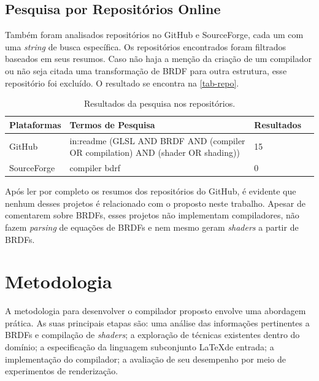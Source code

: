 \documentclass[english, 
               brazil, 
               bsc] %
               {dcomp-abntex2}
\begin{document}
\section{Pesquisa por Repositórios Online}
Também foram analisados repositórios no GitHub e SourceForge, cada um com uma \textit{string} de busca específica. Os repositórios encontrados foram filtrados baseados em seus resumos. Caso não haja a menção da criação de um compilador ou não seja citada uma transformação de BRDF para outra estrutura, esse repositório foi excluído. O resultado se encontra na \autoref{tab-repo}.






\begin{table}[H]
\ABNTEXfontereduzida
\caption[bases]{\small Resultados da pesquisa nos repositórios.}
\label{tab-repo}
\begin{tabular}{p{2.6cm}|p{6.0cm}|p{2.25cm}|p{3.40cm}}
   \textbf{Plataformas} & \textbf{Termos de Pesquisa}  & \textbf{Resultados}\\
   \hline
   GitHub
   &
   in:readme (GLSL AND BRDF AND  (compiler OR compilation) AND (shader OR shading))
   & 15
   \\ \hline
   SourceForge
   &
   compiler bdrf
   & 0
\end{tabular}
\end{table}




Após ler por completo os resumos dos repositórios do GitHub, é evidente que nenhum desses projetos é relacionado com o proposto neste trabalho. Apesar de comentarem sobre BRDFs, esses projetos não implementam compiladores, não fazem \textit{parsing} de equações de BRDFs e nem mesmo geram \textit{shaders} a partir de BRDFs.


\chapter{Metodologia} \label{metodologia}


A metodologia para desenvolver o compilador proposto envolve uma abordagem prática. As suas principais etapas são: uma análise das informações pertinentes a BRDFs e compilação de \textit{shaders}; a exploração de técnicas existentes dentro do domínio; a especificação da linguagem subconjunto \LaTeX de entrada;  a implementação do compilador; a avaliação de seu desempenho por meio de experimentos de renderização.
\end{document}

